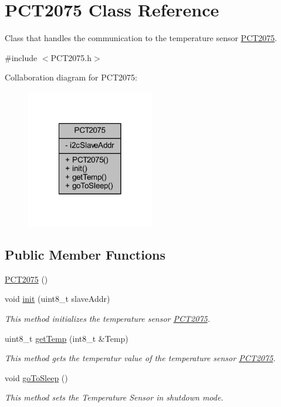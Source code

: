 \hypertarget{class_p_c_t2075}{}\section{P\+C\+T2075 Class Reference}
\label{class_p_c_t2075}


Class that handles the communication to the temperature sensor \hyperlink{class_p_c_t2075}{P\+C\+T2075}.  




{\ttfamily \#include $<$P\+C\+T2075.\+h$>$}



Collaboration diagram for P\+C\+T2075\+:\nopagebreak
\begin{figure}[H]
\begin{center}
\leavevmode
\includegraphics[width=158pt]{class_p_c_t2075__coll__graph}
\end{center}
\end{figure}
\subsection*{Public Member Functions}
\begin{DoxyCompactItemize}
\item 
\hyperlink{class_p_c_t2075_a64b28c17c67573170b0c5614ffb59924}{P\+C\+T2075} ()
\item 
void \hyperlink{class_p_c_t2075_ad46bac6d6b214df0f3eba00c88154eb1}{init} (uint8\+\_\+t slave\+Addr)
\begin{DoxyCompactList}\small\item\em This method initializes the temperature sensor \hyperlink{class_p_c_t2075}{P\+C\+T2075}. \end{DoxyCompactList}\item 
uint8\+\_\+t \hyperlink{class_p_c_t2075_ae472dd7225a9a4c38badafe5e3fcc622}{get\+Temp} (int8\+\_\+t \&Temp)
\begin{DoxyCompactList}\small\item\em This method gets the temperatur value of the temperature sensor \hyperlink{class_p_c_t2075}{P\+C\+T2075}. \end{DoxyCompactList}\item 
void \hyperlink{class_p_c_t2075_a01d8e93edecac7dcf893ab5d5d6a2081}{go\+To\+Sleep} ()
\begin{DoxyCompactList}\small\item\em This method sets the Temperature Sensor in shutdown mode. \end{DoxyCompactList}\end{DoxyCompactItemize}
